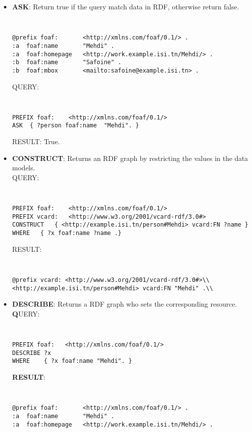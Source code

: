 \begin{itemize}
\item \textbf{ASK}: Return true if the query match data in RDF, otherwise return false.\\
{\tt \small
\begin{verbatim}
@prefix foaf:       <http://xmlns.com/foaf/0.1/> .
:a  foaf:name       "Mehdi" .
:a  foaf:homepage   <http://work.example.isi.tn/Mehdi/> .
:b  foaf:name       "Safoine" .
:b  foaf:mbox       <mailto:safoine@example.isi.tn> .
\end{verbatim}
}
\newpage
QUERY: 
{\tt \small
\begin{verbatim}
PREFIX foaf:    <http://xmlns.com/foaf/0.1/>
ASK  { ?person foaf:name  "Mehdi". }
\end{verbatim}
}
RESULT: True.
\item \textbf{CONSTRUCT}: Returns an RDF graph by restricting the values in the data models.\\
QUERY:
{\tt \small
\begin{verbatim}
PREFIX foaf:    <http://xmlns.com/foaf/0.1/>
PREFIX vcard:   <http://www.w3.org/2001/vcard-rdf/3.0#>
CONSTRUCT   { <http://example.isi.tn/person#Mehdi> vcard:FN ?name }
WHERE   { ?x foaf:name ?name .}
\end{verbatim}
}
RESULT: 
{\tt \small
\begin{verbatim}
@prefix vcard: <http://www.w3.org/2001/vcard-rdf/3.0#>\\
<http://example.isi.tn/person#Mehdi> vcard:FN "Mehdi" .\\
\end{verbatim}
}
\item \textbf{DESCRIBE}: Returns a RDF graph who sets the corresponding resource.\\
\textbf QUERY:
{\tt \small
\begin{verbatim}
PREFIX foaf:   <http://xmlns.com/foaf/0.1/>
DESCRIBE ?x
WHERE    { ?x foaf:name "Mehdi". }
\end{verbatim}
}
\textbf{RESULT}:
{\tt \small
\begin{verbatim}
@prefix foaf:       <http://xmlns.com/foaf/0.1/> .
:a  foaf:name       "Mehdi" .
:a  foaf:homepage   <http://work.example.isi.tn/Mehdi/> .
\end{verbatim}
}
\end{itemize} 
